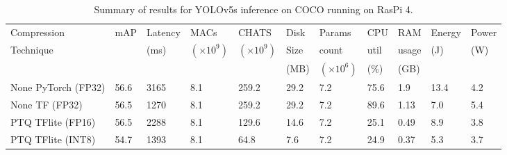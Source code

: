 \begin{table}[]
    \centering
    \begin{tabular}{| l || l | l | l | l | l | l | l | l | l | l|} 
        \hline
        Compression & mAP & Latency & MACs & CHATS & Disk & Params & CPU & RAM & Energy & Power \\
        Technique &  & (ms) & $(\times 10^9)$& $(\times 10^9)$ & Size & count & util & usage &(J) & (W) \\
         &  & & & & (MB) & $(\times 10^6)$ & (\%) & (GB) & & \\
        \hline        
        None PyTorch (FP32)     & 56.6 & 3165 & 8.1 & 259.2  & 29.2 & 7.2 & 75.6 & 1.9  & 13.4 & 4.2 \\
        None TF (FP32)          & 56.5 & 1270 & 8.1 & 259.2 & 29.2 & 7.2 & 89.6 & 1.13 & 7.0 & 5.4 \\
        PTQ TFlite (FP16)  & 56.5 & 2288 & 8.1 & 129.6 & 14.6 & 7.2 & 25.1 & 0.49 & 8.9 & 3.8 \\
        PTQ TFlite (INT8)  & 54.7 & 1393 & 8.1 & 64.8 & 7.6  & 7.2 & 24.9 & 0.37 & 5.3 & 3.7 \\
        \hline
    \end{tabular}
    \caption{Summary of results for YOLOv5s inference on COCO running on RasPi 4.}%
    \label{tab:Yolov5s-COCO}
\end{table}



